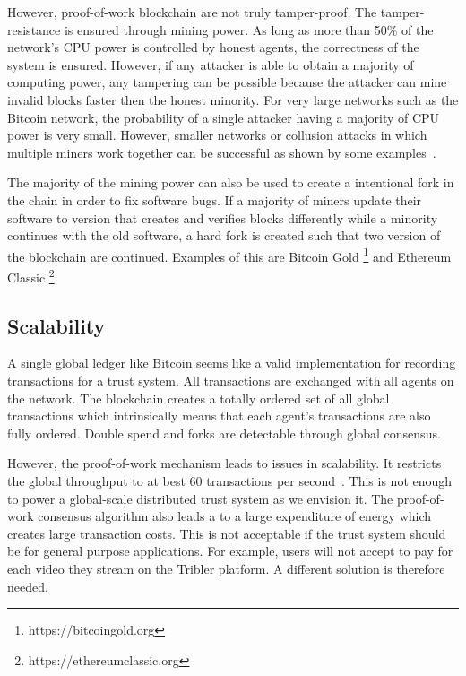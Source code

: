 However, proof-of-work blockchain are not truly tamper-proof. The tamper-resistance is ensured through
mining power. As long as more than 50\% of the network's CPU power is controlled by honest agents, 
the correctness of the system is ensured. However, if any attacker is able to obtain a majority of
computing power, any tampering can be possible because the attacker can mine invalid blocks faster
then the honest minority. For very large networks such as the Bitcoin network, the probability of 
a single attacker having a majority of CPU power is very small. However, smaller networks or collusion
attacks in which multiple miners work together can be successful as shown by some examples~\cite{51percentbitcoingold, 51percentverge}.

The majority of the mining power can also be used to create a intentional fork in the chain in order 
to fix software bugs. If a majority of miners update their software to version that creates and verifies blocks
differently while a minority continues with the old software, a hard fork is created such that two
version of the blockchain are continued. Examples of this are Bitcoin Gold \footnote{https://bitcoingold.org} and Ethereum Classic \footnote{https://ethereumclassic.org}.

\subsection{Scalability}
A single global ledger like Bitcoin seems like a valid implementation for recording transactions for a
trust system. All transactions are exchanged with all agents on the network. The blockchain 
creates a totally ordered set of all global transactions which intrinsically means that each agent's 
transactions are also fully ordered. Double spend and forks are detectable through global consensus. 

However, the proof-of-work mechanism leads to issues in scalability. It restricts the global throughput
to at best 60 transactions per second~\cite{gervais2016security}. This is not enough to power a global-scale distributed trust 
system as we envision it. The proof-of-work consensus algorithm also leads a to a large expenditure of energy which creates 
large transaction costs. This is not acceptable if the trust system should be for general purpose 
applications. For example, users will not accept to pay for each video they stream on the Tribler 
platform. A different solution is therefore needed.

